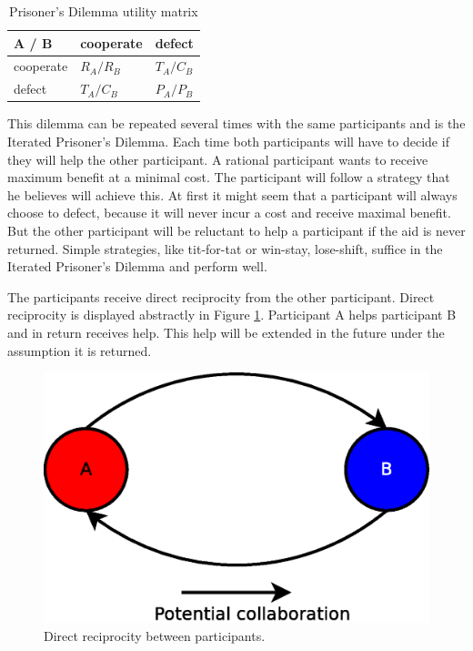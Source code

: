 \begin{table}
\center
	\begin{tabular}{l|ll}
	A / B       & cooperate  & defect     \\ \hline
	cooperate & $R_A /R_B$ & $T_A /C_B$ \\
	defect    & $T_A /C_B$ & $P_A /P_B$
	\end{tabular}
\caption{Prisoner's Dilemma utility matrix}
\label{tab:pd-um}
\end{table}

This dilemma can be repeated several times with the same participants and is the Iterated Prisoner's Dilemma.
Each time both participants will have to decide if they will help the other participant.
A rational participant wants to receive maximum benefit at a minimal cost.
The participant will follow a strategy that he believes will achieve this.
At first it might seem that a participant will always choose to defect,
because it will never incur a cost and receive maximal benefit.
But the other participant will be reluctant to help a participant if the aid is never returned.
Simple strategies, like tit-for-tat or win-stay, lose-shift, suffice in the Iterated Prisoner's Dilemma
and perform well\cite{Nowak-Cooperation}.

The participants receive direct reciprocity from the other participant\cite{Nowak-Cooperation}.
Direct reciprocity is displayed abstractly in Figure \ref{fig:direct-reciprocity}.
Participant A helps participant B and in return receives help.
This help will be extended in the future under the assumption it is returned.

\begin{figure}
	\centerline{\includegraphics[scale=0.3]{problemDescription/figs/direct-reciprocity.eps}}
	\caption{Direct reciprocity between participants.}
	\label{fig:direct-reciprocity}
\end{figure}

